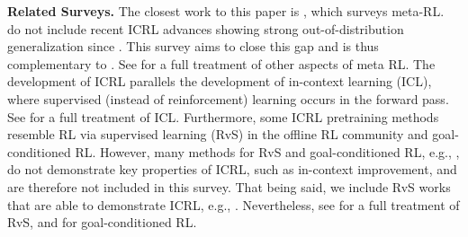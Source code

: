 \documentclass{article}
\newcommand{\tb}[1]{\textbf{#1}}
\newcommand{\compactpara}[1]{\noindent\tb{#1}\quad}
\begin{document}
\compactpara{Related Surveys.}
The closest work to this paper is \citet{beck2023survey},
which surveys meta-RL.
\citet{beck2023survey} do not include recent ICRL advances showing strong out-of-distribution generalization since \citet{laskinContextReinforcementLearning2022}.
This survey aims to close this gap and is thus complementary to \citet{beck2023survey}.
See \citet{beck2023survey} for a full treatment of other aspects of meta RL.
The development of ICRL parallels the development of in-context learning (ICL),
where supervised (instead of reinforcement) learning occurs in the forward pass.
See \citet{dongSurveyIncontextLearning2024} for a full treatment of ICL.
Furthermore, some ICRL pretraining methods resemble RL via supervised learning (RvS) in the offline RL community and goal-conditioned RL.
However,
many methods for RvS and goal-conditioned RL, e.g., \citet{chenDecisionTransformerReinforcement2021},
do not demonstrate key properties of ICRL, such as in-context improvement,
and are therefore not included in this survey.
That being said,
we include
RvS works that are able to demonstrate ICRL, e.g., \citet{laskinContextReinforcementLearning2022}.
Nevertheless, see \citet{emmonsRvSWhatEssential2022,wenLargeSequenceModels2023} for a full treatment of RvS, and  \citet{liuGoalConditionedReinforcementLearning2022} for goal-conditioned RL.
\end{document}
